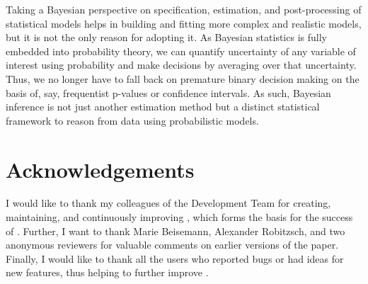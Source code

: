\documentclass[
]{jss}
\begin{document}
Taking a Bayesian perspective on specification, estimation, and
post-processing of statistical models helps in building and fitting more
complex and realistic models, but it is not the only reason for adopting
it. As Bayesian statistics is fully embedded into probability theory, we
can quantify uncertainty of any variable of interest using probability
and make decisions by averaging over that uncertainty. Thus, we no
longer have to fall back on premature binary decision making on the
basis of, say, frequentist p-values or confidence intervals. As such,
Bayesian inference is not just another estimation method but a distinct
statistical framework to reason from data using probabilistic models.

\hypertarget{acknowledgements}{%
\section{Acknowledgements}\label{acknowledgements}}

I would like to thank my colleagues of the  Development
Team for creating, maintaining, and continuously improving
, which forms the basis for the success of .
Further, I want to thank Marie Beisemann, Alexander Robitzsch, and two
anonymous reviewers for valuable comments on earlier versions of the
paper. Finally, I would like to thank all the users who reported bugs or
had ideas for new features, thus helping to further improve .

\renewcommand\refname{References}

\end{document}
